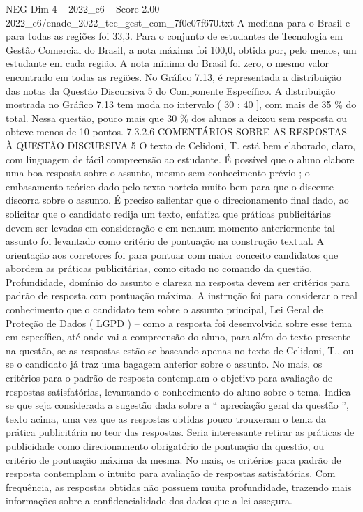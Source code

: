 \begin{textsample}{NEG Dim 4 – 2022\_c6 – Score 2.00 – 2022\_c6/enade\_2022\_tec\_gest\_com\_7f0e07f670.txt}
A mediana para o Brasil e para todas as regiões foi 33,3.
Para o conjunto de estudantes de Tecnologia em Gestão Comercial do Brasil, a nota máxima foi 100,0, obtida por, pelo menos, um estudante em cada região.
A nota mínima do Brasil foi zero, o mesmo valor encontrado em todas as regiões.
No Gráfico 7.13, é representada a distribuição das notas da Questão Discursiva 5 do Componente Específico.
A distribuição mostrada no Gráfico 7.13 tem moda no intervalo ( 30 ; 40 ], com mais de 35 \% do total.
Nessa questão, pouco mais que 30 \% dos alunos a deixou sem resposta ou obteve menos de 10 pontos. 7.3.2.6 COMENTÁRIOS SOBRE AS RESPOSTAS À QUESTÃO DISCURSIVA 5 O texto de Celidoni, T. está bem elaborado, claro, com linguagem de fácil compreensão ao estudante.
É possível que o aluno elabore uma boa resposta sobre o assunto, mesmo sem conhecimento prévio ; o embasamento teórico dado pelo texto norteia muito bem para que o discente discorra sobre o assunto.
É preciso salientar que o direcionamento final dado, ao solicitar que o candidato redija um texto, enfatiza que práticas publicitárias devem ser levadas em consideração e em nenhum momento anteriormente tal assunto foi levantado como critério de pontuação na construção textual.
A orientação aos corretores foi para pontuar com maior conceito candidatos que abordem as práticas publicitárias, como citado no comando da questão.
Profundidade, domínio do assunto e clareza na resposta devem ser critérios para padrão de resposta com pontuação máxima.
A instrução foi para considerar o real conhecimento que o candidato tem sobre o assunto principal, Lei Geral de Proteção de Dados ( LGPD ) – como a resposta foi desenvolvida sobre esse tema em específico, até onde vai a compreensão do aluno, para além do texto presente na questão, se as respostas estão se baseando apenas no texto de Celidoni, T., ou se o candidato já traz uma bagagem anterior sobre o assunto.
No mais, os critérios para o padrão de resposta contemplam o objetivo para avaliação de respostas satisfatórias, levantando o conhecimento do aluno sobre o tema.
Indica -se que seja considerada a sugestão dada sobre a “ apreciação geral da questão ”, texto acima, uma vez que as respostas obtidas pouco trouxeram o tema da prática publicitária no teor das respostas.
Seria interessante retirar as práticas de publicidade como direcionamento obrigatório de pontuação da questão, ou critério de pontuação máxima da mesma.
No mais, os critérios para padrão de resposta contemplam o intuito para avaliação de respostas satisfatórias.
Com frequência, as respostas obtidas não possuem muita profundidade, trazendo mais informações sobre a confidencialidade dos dados que a lei assegura.

\end{textsample}
